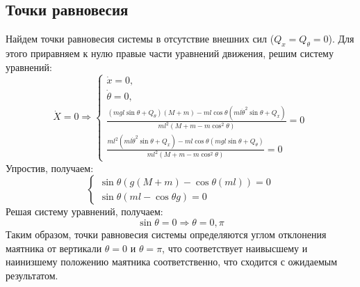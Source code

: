 \subsection{Точки равновесия}
Найдем точки равновесия системы в отсутствие внешних сил ($Q_x = Q_{\theta} = 0$). 
Для этого приравняем к нулю правые части уравнений движения, решим систему уравнений:
\begin{equation}
    \dot{X} = 0 \Rightarrow 
    \begin{cases}
        \dot{x} = 0, \\
        \dot{\theta} = 0, \\
        \frac{(mgl\sin\theta + Q_{\theta})(M + m) - ml\cos\theta(ml\dot{\theta}^2\sin\theta + Q_x)}{ml^2(M + m - m\cos^2\theta)} = 0 \\ 
        \frac{ml^2(ml\dot{\theta}^2\sin\theta + Q_x) - ml\cos\theta(mgl\sin\theta + Q_{\theta})}{ml^2(M + m - m\cos^2\theta)} = 0
    \end{cases}
\end{equation}
Упростив, получаем: 
\begin{equation}
    \begin{cases}
        \sin\theta(g(M + m) - \cos\theta(ml)) = 0 \\ 
        \sin\theta(ml - \cos\theta g) = 0
    \end{cases}
\end{equation}
Решая систему уравнений, получаем:
\begin{equation}
    \sin\theta = 0 \Rightarrow \theta = 0, \pi 
\end{equation}
Таким образом, точки равновесия системы определяются углом отклонения маятника от вертикали $\theta = 0$ и $\theta = \pi$, 
что соответствует наивысшему и наинизшему положению маятника соответственно, что сходится с ожидаемым результатом. 

